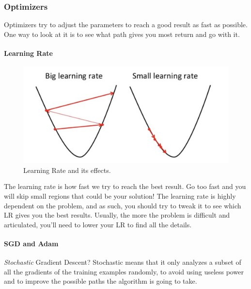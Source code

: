 \subsubsection{Optimizers}\label{s:trainalg-opt}

Optimizers try to adjust the parameters to reach a good result as fast as possible. One way to look at it is to see what path gives you most return and go with it.

\paragraph{Learning Rate}\label{s:trainalg-opt-lr}

\begin{figure}[H]
	\centering
	\includegraphics[width=.75\linewidth]{images/learningrate}
	\caption{Learning Rate and its effects.}
	\label{f:learningrate}
\end{figure}

The learning rate is how fast we try to reach the best result. Go too fast and you will skip small regions that could be your solution! The learning rate is highly dependent on the problem, and as such, you should try to tweak it to see which LR gives you the best results. Usually, the more the problem is difficult and articulated, you'll need to lower your LR to find all the details.

\paragraph{SGD and Adam}\label{s:trainalg-opt-sgdadam}

\emph{Stochastic} Gradient Descent? Stochastic means that it only analyzes a subset of all the gradients of the training examples randomly, to avoid using useless power and to improve the possible paths the algorithm is going to take.

